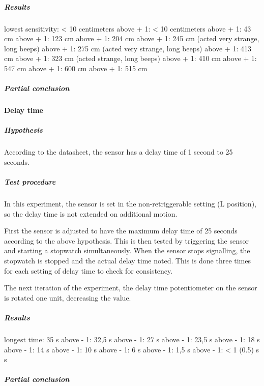 \subparagraph{Results}

lowest sensitivity: < 10 centimeters
above + 1: < 10 centimeters
above + 1: 43 cm
above + 1: 123 cm
above + 1: 204 cm
above + 1: 245 cm (acted very strange, long beeps)
above + 1: 275 cm (acted very strange, long beeps)
above + 1: 413 cm
above + 1: 323 cm (acted strange, long beeps)
above + 1: 410 cm
above + 1: 547 cm
above + 1: 600 cm
above + 1: 515 cm


\subparagraph{Partial conclusion}


\paragraph{Delay time}

\subparagraph{Hypothesis}

According to the datasheet, the sensor has a delay time of 1 second to 25 seconds.

\subparagraph{Test procedure}

In this experiment, the sensor is set in the non-retriggerable setting (L
position), so the delay time is not extended on additional motion.

First the sensor is adjusted to have the maximum delay time of 25 seconds
according to the above hypothesis. This is then tested by triggering the sensor
and starting a stopwatch simultaneously. When the sensor stops signalling, the
stopwatch is stopped and the actual delay time noted. This is done three times
for each setting of delay time to check for consistency.

The next iteration of the experiment, the delay time potentiometer on the sensor
is rotated one unit, decreasing the value.

\subparagraph{Results}

longest time: 35 s
above - 1: 32,5 s
above - 1: 27 s
above - 1: 23,5 s
above - 1: 18 s
above - 1: 14 s
above - 1: 10 s
above - 1: 6 s
above - 1: 1,5 s
above - 1: < 1 (0.5) s s

\subparagraph{Partial conclusion}
